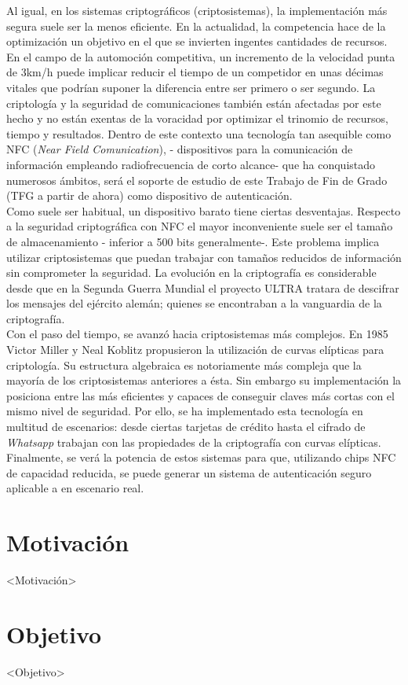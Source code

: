 \documentclass[../PFC.tex]{subfiles}
\begin{document}
Al igual, en los sistemas criptográficos (criptosistemas), la implementación más segura suele ser la menos eficiente. En la actualidad, la competencia  hace de la optimización un objetivo en el que se invierten ingentes cantidades de recursos. En el campo de la automoción competitiva, un incremento de la velocidad punta de 3km/h puede implicar reducir el tiempo de un competidor en unas décimas vitales que podrían suponer la diferencia entre ser primero o ser segundo. La criptología y la seguridad de comunicaciones también están afectadas por este hecho y no están exentas de la voracidad por optimizar el trinomio de recursos, tiempo y resultados. Dentro de este contexto una tecnología tan asequible como NFC (\textit{Near Field Comunication}), - dispositivos para la comunicación de información empleando radiofrecuencia de corto alcance- que ha conquistado numerosos ámbitos, será el soporte de estudio de este Trabajo de Fin de Grado (TFG a partir de ahora) como dispositivo de autenticación.\\

Como suele ser habitual, un dispositivo barato tiene ciertas desventajas. Respecto a la seguridad criptográfica con NFC el mayor inconveniente suele ser el tamaño de almacenamiento - inferior a 500 bits generalmente-. Este problema implica utilizar criptosistemas que puedan trabajar con tamaños reducidos de información sin comprometer la seguridad. La evolución en la criptografía es considerable desde que en la Segunda Guerra Mundial el proyecto ULTRA tratara de descifrar los mensajes del ejército alemán; quienes se encontraban a la vanguardia de la criptografía.\\

Con el paso del tiempo, se avanzó hacia criptosistemas más complejos. En 1985 Victor Miller y Neal Koblitz propusieron la utilización de curvas elípticas para criptología. Su estructura algebraica es notoriamente más compleja que la mayoría de los criptosistemas anteriores a ésta. Sin embargo su implementación la posiciona entre las más eficientes y capaces de conseguir claves más cortas con el mismo nivel de seguridad\cite{lucena}. Por ello, se ha implementado esta tecnología en multitud de escenarios: desde ciertas tarjetas de crédito hasta el cifrado de \textit{Whatsapp}\cite{whatsappEncryption} trabajan con las propiedades de la criptografía con curvas elípticas. \\

Finalmente, se verá la potencia de estos sistemas para que, utilizando chips NFC de capacidad reducida, se puede generar un sistema de autenticación seguro aplicable a en escenario real.


\section{Motivación}
\label{Motivación}

<Motivación>

\section{Objetivo}
\label{Objetivo}

<Objetivo>
\end{document}
